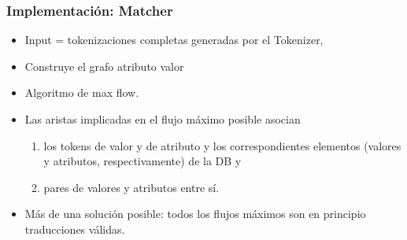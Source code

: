 \begin{frame}[<+->]
\frametitle{Implementación: Matcher}
  
  \begin{itemize}
    \item Input = tokenizaciones completas generadas por el Tokenizer,
    \item Construye el grafo atributo valor
    \item Algoritmo de max flow.
    \item Las aristas implicadas en el flujo máximo posible asocian 
    \begin{enumerate}
      \item los tokens de valor y de atributo y los correspondientes elementos (valores y atributos, respectivamente) de la DB y 
      \item pares de valores y atributos entre sí.
    \end{enumerate}
    \item Más de una solución posible: todos los flujos máximos son en principio traducciones válidas.
\end{itemize}

\end{frame}



